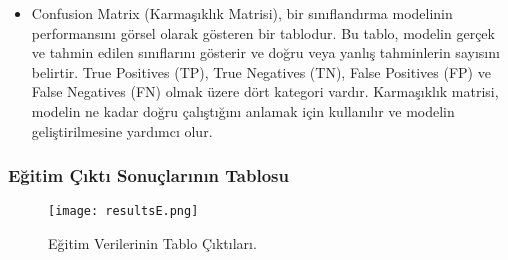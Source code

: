 \documentclass[]{article}
\begin{document}
		\begin{itemize}
			\item Confusion Matrix (Karmaşıklık Matrisi), bir sınıflandırma modelinin performansını görsel olarak gösteren bir tablodur. Bu tablo, modelin gerçek ve tahmin edilen sınıflarını gösterir ve doğru veya yanlış tahminlerin sayısını belirtir. True Positives (TP), True Negatives (TN), False Positives (FP) ve False Negatives (FN) olmak üzere dört kategori vardır. Karmaşıklık matrisi, modelin ne kadar doğru çalıştığını anlamak için kullanılır ve modelin geliştirilmesine yardımcı olur.
		\end{itemize}
		\newpage
	\subsubsection{Eğitim Çıktı Sonuçlarının Tablosu}
		\begin{figure}[!ht]
			\centering
			\texttt{[image: resultsE.png]}
			\caption{Eğitim Verilerinin Tablo Çıktıları.}
		\end{figure}
\end{document}
